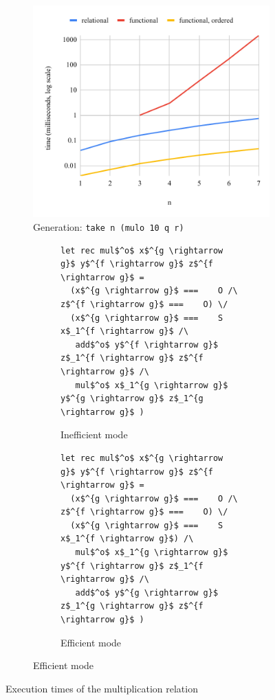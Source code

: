 \begin{figure}[h]
  \hfill

  \begin{subfigure}[b]{0.49\textwidth}
    \includegraphics[width=\textwidth]{fig/muloIOO.pdf}
    \caption{Generation: \lstinline{take n (mulo 10 q r)}}
    \label{fig:mulo_IOO}
  \end{subfigure}
  \hfill
  \begin{subfigure}[b]{0.45\textwidth}
    \begin{subfigure}[b]{\textwidth}
      \begin{lstlisting}[frame=tb]
let rec mul$^o$ x$^{g \rightarrow g}$ y$^{f \rightarrow g}$ z$^{f \rightarrow g}$ =
  (x$^{g \rightarrow g}$ ===    O /\ z$^{f \rightarrow g}$ ===    O) \/
  (x$^{g \rightarrow g}$ ===    S x$_1^{f \rightarrow g}$ /\
   add$^o$ y$^{f \rightarrow g}$ z$_1^{f \rightarrow g}$ z$^{f \rightarrow g}$ /\
   mul$^o$ x$_1^{g \rightarrow g}$ y$^{g \rightarrow g}$ z$_1^{g \rightarrow g}$ )
    \end{lstlisting}
      \caption{Inefficient mode}
      \label{fig:mult_modded_bad}
    \end{subfigure}
    \hfill

    \begin{subfigure}[b]{\textwidth}
      \begin{lstlisting}[frame=tb]
let rec mul$^o$ x$^{g \rightarrow g}$ y$^{f \rightarrow g}$ z$^{f \rightarrow g}$ =
  (x$^{g \rightarrow g}$ ===    O /\ z$^{f \rightarrow g}$ ===    O) \/
  (x$^{g \rightarrow g}$ ===    S x$_1^{f \rightarrow g}$) /\
   mul$^o$ x$_1^{g \rightarrow g}$ y$^{f \rightarrow g}$ z$_1^{f \rightarrow g}$ /\
   add$^o$ y$^{g \rightarrow g}$ z$_1^{g \rightarrow g}$ z$^{f \rightarrow g}$ )
    \end{lstlisting}
      \caption{Efficient mode}
      \label{fig:mult_modded_good}
    \end{subfigure}
  \end{subfigure}

  \caption{Execution times of the multiplication relation}
  \label{fig:mulo_time}
\end{figure}

